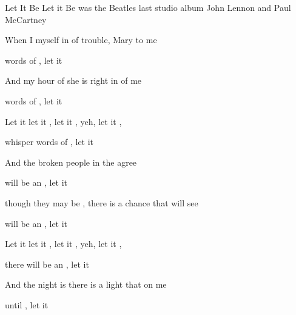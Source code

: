 \begin{SBSong}{Let It Be}
  {Let it Be was the Beatles last studio album}
  {John Lennon and Paul McCartney}
  \begin{SBVerse}
    When I  myself in  of trouble, 
     Mary  to me
    
     words of , let it  
    
    And  my hour of  she is 
     right in  of me
    
     words of , let it  
  \end{SBVerse} 
  \begin{SBChorus}   
    Let it  let it , let it , yeh, let it , 
    
    whisper words of , let it  
  \end{SBChorus}
  \begin{SBVerse}
    And  the broken  people 
     in the  agree
    
     will be an , let it  
    
     though they may be , there is 
     a chance \WBLineBrk that  will see
    
     will be an , let it  
  \end{SBVerse} 
  \begin{SBChorus}   
    Let it  let it , let it , yeh, let it , 
    
    there will be an , let it  
  \end{SBChorus}
  \begin{SBVerse}
    And  the night is  there is 
     a light that  on me
    
     until , let it  
    

\end{SBVerse}
\end{SBSong}
